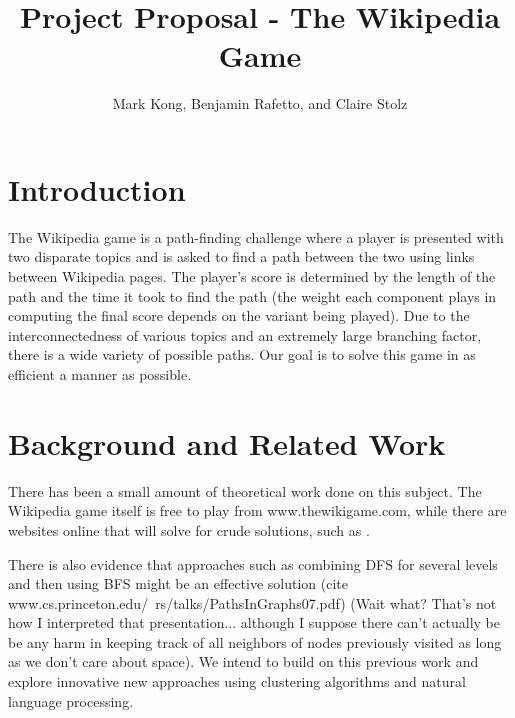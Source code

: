 \documentclass[11pt]{article}
\title{Project Proposal - The Wikipedia Game}
\author{Mark Kong, Benjamin Rafetto, and Claire Stolz}
\begin{document}
\maketitle{}


\section{Introduction}

The Wikipedia game \cite{www.thewikigame.com} is a path-finding challenge where a player is presented with two disparate topics and is asked to find a path between the two using links between Wikipedia pages. The player's score is determined by the length of the path and the time it took to find the path (the weight each component plays in computing the final score depends on the variant being played). Due to the interconnectedness of various topics and an extremely large branching factor, there is a wide variety of possible paths. Our goal is to solve this game in as efficient a manner as possible.


\section{Background and Related Work}

There has been a small amount of theoretical work done on this subject. The Wikipedia game itself is free to play from www.thewikigame.com, while there are websites online that will solve for crude solutions, such as \cite{www.sixdegreesofwikipedia.com}.

There is also evidence that approaches such as combining DFS for several levels and then using BFS might be an effective solution (cite www.cs.princeton.edu/~rs/talks/PathsInGraphs07.pdf) (Wait what?  That's not how I interpreted that presentation... although I suppose there can't actually be be any harm in keeping track of all neighbors of nodes previously visited as long as we don't care about space). We intend to build on this previous work and explore innovative new approaches using clustering algorithms and natural language processing.
\end{document}
